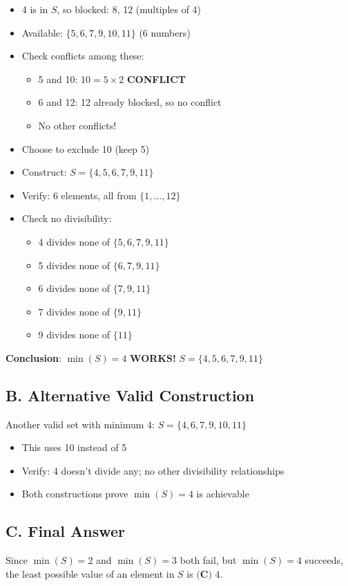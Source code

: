 \documentclass[12pt]{article}
\begin{document}
\begin{conversionbox}
\begin{itemize}
    \item 4 is in $S$, so blocked: 8, 12 (multiples of 4)
    \item Available: $\{5, 6, 7, 9, 10, 11\}$ (6 numbers)
    \item Check conflicts among these:
    \begin{itemize}
        \item 5 and 10: $10 = 5 \times 2$ \textbf{CONFLICT}
        \item 6 and 12: 12 already blocked, so no conflict
        \item No other conflicts!
    \end{itemize}
    \item Choose to exclude 10 (keep 5)
    \item Construct: $S = \{4, 5, 6, 7, 9, 11\}$
    \item Verify: 6 elements, all from $\{1,\ldots,12\}$
    \item Check no divisibility:
    \begin{itemize}
        \item 4 divides none of $\{5,6,7,9,11\}$ \checkmark
        \item 5 divides none of $\{6,7,9,11\}$ \checkmark
        \item 6 divides none of $\{7,9,11\}$ \checkmark
        \item 7 divides none of $\{9,11\}$ \checkmark
        \item 9 divides none of $\{11\}$ \checkmark
    \end{itemize}
\end{itemize}

\textbf{Conclusion}: $\min(S) = 4$ \textbf{WORKS!} $\boxed{S = \{4, 5, 6, 7, 9, 11\}}$

\subsection*{B. Alternative Valid Construction}

Another valid set with minimum 4: $S = \{4, 6, 7, 9, 10, 11\}$

\begin{itemize}
    \item This uses 10 instead of 5
    \item Verify: 4 doesn't divide any; no other divisibility relationships
    \item Both constructions prove $\min(S) = 4$ is achievable
\end{itemize}

\subsection*{C. Final Answer}

Since $\min(S) = 2$ and $\min(S) = 3$ both fail, but $\min(S) = 4$ succeeds, the least possible value of an element in $S$ is $\boxed{\textbf{(C) } 4}$.
\end{conversionbox}
\end{document}
